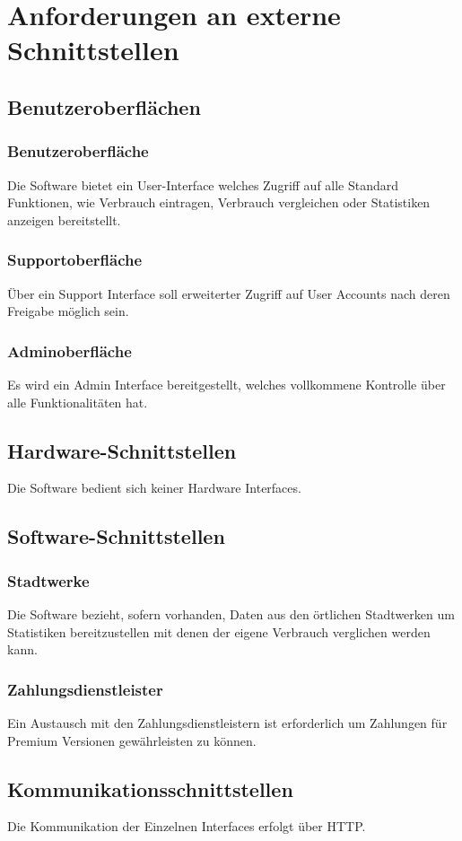 \section{Anforderungen an externe Schnittstellen}
\subsection{Benutzeroberflächen}
\subsubsection{Benutzeroberfläche}
Die Software bietet ein User-Interface welches Zugriff auf alle Standard Funktionen, wie Verbrauch eintragen, Verbrauch vergleichen oder Statistiken anzeigen bereitstellt.
\subsubsection{Supportoberfläche}
Über ein Support Interface soll erweiterter Zugriff auf User Accounts nach deren Freigabe möglich sein.
\subsubsection{Adminoberfläche}
Es wird ein Admin Interface bereitgestellt, welches vollkommene Kontrolle über alle Funktionalitäten hat.
\subsection{Hardware-Schnittstellen}
Die Software bedient sich keiner Hardware Interfaces.
\subsection{Software-Schnittstellen}
\subsubsection{Stadtwerke}
Die Software bezieht, sofern vorhanden, Daten aus den örtlichen Stadtwerken um Statistiken bereitzustellen mit denen der eigene Verbrauch verglichen werden kann.
\subsubsection{Zahlungsdienstleister}
Ein Austausch mit den Zahlungsdienstleistern ist erforderlich um Zahlungen für Premium Versionen gewährleisten zu können.
\subsection{Kommunikationsschnittstellen}
Die Kommunikation der Einzelnen Interfaces erfolgt über HTTP.